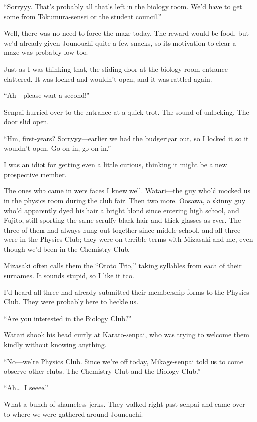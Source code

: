 \documentclass[
    a4paper,
    12pt,
    twoside,
    openany,
    UTF8,
    fontset=windows
]{ctexbook}
\begin{document}
``Sorryyy. That's probably all that's left in the biology room. We'd have to get some from Tokumura-sensei or the student council.''

Well, there was no need to force the maze today. The reward would be food, but we'd already given Jounouchi quite a few snacks, so its motivation to clear a maze was probably low too.

Just as I was thinking that, the sliding door at the biology room entrance clattered. It was locked and wouldn't open, and it was rattled again.

``Ah---please wait a second!''

Senpai hurried over to the entrance at a quick trot. The sound of unlocking. The door slid open.

``Hm, first-years? Sorryyy---earlier we had the budgerigar out, so I locked it so it wouldn't open. Go on in, go on in.''

I was an idiot for getting even a little curious, thinking it might be a new prospective member.

The ones who came in were faces I knew well. Watari---the guy who'd mocked us in the physics room during the club fair. Then two more. Oosawa, a skinny guy who'd apparently dyed his hair a bright blond since entering high school, and Fujito, still sporting the same scruffy black hair and thick glasses as ever. The three of them had always hung out together since middle school, and all three were in the Physics Club; they were on terrible terms with Mizasaki and me, even though we'd been in the Chemistry Club.

Mizasaki often calls them the ``Ototo Trio,'' taking syllables from each of their surnames. It sounds stupid, so I like it too.

I'd heard all three had already submitted their membership forms to the Physics Club. They were probably here to heckle us.

``Are you interested in the Biology Club?''

Watari shook his head curtly at Karato-senpai, who was trying to welcome them kindly without knowing anything.

``No---we're Physics Club. Since we're off today, Mikage-senpai told us to come observe other clubs. The Chemistry Club and the Biology Club.''

``Ah\dots\ I seeee.''

What a bunch of shameless jerks. They walked right past senpai and came over to where we were gathered around Jounouchi.
\end{document}
